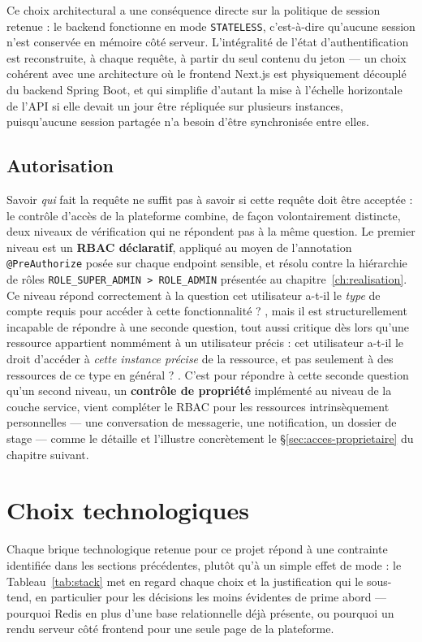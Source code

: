 Ce choix architectural a une conséquence directe sur la politique de
session retenue : le backend fonctionne en mode \texttt{STATELESS},
c'est-à-dire qu'aucune session n'est conservée en mémoire côté serveur.
L'intégralité de l'état d'authentification est reconstruite, à chaque
requête, à partir du seul contenu du jeton --- un choix cohérent avec une
architecture où le frontend Next.js est physiquement découplé du backend
Spring Boot, et qui simplifie d'autant la mise à l'échelle horizontale de
l'API si elle devait un jour être répliquée sur plusieurs instances,
puisqu'aucune session partagée n'a besoin d'être synchronisée entre elles.

\subsection{Autorisation}
\label{sec:autorisation}

Savoir \emph{qui} fait la requête ne suffit pas à savoir si cette requête
doit être acceptée : le contrôle d'accès de la plateforme combine, de
façon volontairement distincte, deux niveaux de vérification qui ne
répondent pas à la même question. Le premier niveau est un
\textbf{RBAC déclaratif}, appliqué au moyen de l'annotation
\texttt{@PreAuthorize} posée sur chaque endpoint sensible, et résolu
contre la hiérarchie de rôles \texttt{ROLE\_SUPER\_ADMIN > ROLE\_ADMIN}
présentée au chapitre~\ref{ch:realisation}. Ce niveau répond correctement
à la question \og cet utilisateur a-t-il le \emph{type} de compte requis
pour accéder à cette fonctionnalité ? \fg, mais il est structurellement
incapable de répondre à une seconde question, tout aussi critique dès lors
qu'une ressource appartient nommément à un utilisateur précis : \og cet
utilisateur a-t-il le droit d'accéder à \emph{cette instance précise} de
la ressource, et pas seulement à des ressources de ce type en général ?
\fg. C'est pour répondre à cette seconde question qu'un second niveau, un
\textbf{contrôle de propriété} implémenté au niveau de la couche service,
vient compléter le RBAC pour les ressources intrinsèquement personnelles
--- une conversation de messagerie, une notification, un dossier de stage
--- comme le détaille et l'illustre concrètement le
\S\ref{sec:acces-proprietaire} du chapitre suivant.

\section{Choix technologiques}

Chaque brique technologique retenue pour ce projet répond à une
contrainte identifiée dans les sections précédentes, plutôt qu'à un
simple effet de mode : le Tableau~\ref{tab:stack} met en regard chaque
choix et la justification qui le sous-tend, en particulier pour les
décisions les moins évidentes de prime abord --- pourquoi Redis en plus
d'une base relationnelle déjà présente, ou pourquoi un rendu serveur côté
frontend pour une seule page de la plateforme.

